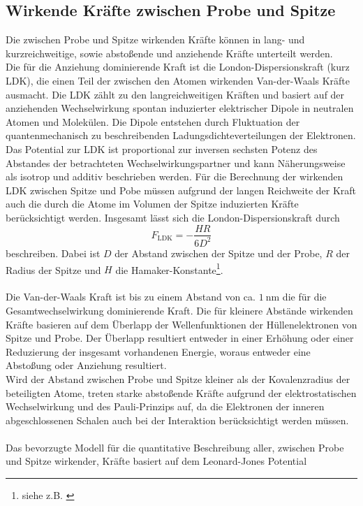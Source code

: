 \subsection{Wirkende Kräfte zwischen Probe und Spitze}
Die zwischen Probe und Spitze wirkenden Kräfte können in lang- und kurzreichweitige, sowie abstoßende und anziehende Kräfte unterteilt werden.\\
Die für die Anziehung dominierende Kraft ist die London-Dispersionskraft (kurz LDK), die einen Teil der zwischen den Atomen wirkenden Van-der-Waals Kräfte ausmacht. Die LDK zählt zu den langreichweitigen Kräften und basiert auf der anziehenden Wechselwirkung spontan induzierter elektrischer Dipole in neutralen Atomen und Molekülen. Die Dipole entstehen durch Fluktuation der quantenmechanisch zu beschreibenden Ladungsdichteverteilungen der Elektronen. Das Potential zur LDK ist proportional zur inversen sechsten Potenz des Abstandes der betrachteten Wechselwirkungspartner und kann Näherungsweise als isotrop und additiv beschrieben werden.
Für die Berechnung der wirkenden LDK zwischen Spitze und Pobe müssen aufgrund der langen Reichweite der Kraft auch die durch die Atome im Volumen der Spitze induzierten Kräfte berücksichtigt werden.
Insgesamt lässt sich die London-Dispersionskraft durch
\begin{equation}
  F_{\text{LDK}} = -\frac{HR}{6D^2}
  \label{eqn:ldk}
\end{equation}
beschreiben. Dabei ist $D$ der Abstand zwischen der Spitze und der Probe, $R$ der Radius der Spitze und $H$ die Hamaker-Konstante\footnote{siehe z.B. \cite{Hamaker}}.\\
\\
Die Van-der-Waals Kraft ist bis zu einem Abstand von ca. $\SI{1}{\nano\meter}$ die für die Gesamtwechselwirkung dominierende Kraft. Die für kleinere Abstände wirkenden Kräfte basieren auf dem Überlapp der Wellenfunktionen der Hüllenelektronen von Spitze und Probe. Der Überlapp resultiert entweder in einer Erhöhung oder einer Reduzierung der insgesamt vorhandenen Energie, woraus entweder eine Abstoßung oder Anziehung resultiert.\\
Wird der Abstand zwischen Probe und Spitze kleiner als der Kovalenzradius der beteiligten Atome, treten starke abstoßende Kräfte aufgrund der elektrostatischen Wechselwirkung und des Pauli-Prinzips auf, da die Elektronen der inneren abgeschlossenen Schalen auch bei der Interaktion berücksichtigt werden müssen.\\
\\
Das bevorzugte Modell für die quantitative Beschreibung aller, zwischen Probe und Spitze wirkender, Kräfte basiert auf dem Leonard-Jones Potential
